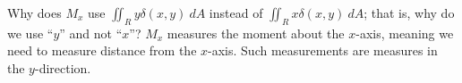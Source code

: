 {Why does $M_x$ use $\iint_R y\delta(x,y)\ dA$ instead of $\iint_R x\delta(x,y)\ dA$; that is, why do we use ``$y$'' and not ``$x$''?
}
{$M_x$ measures the moment about the $x$-axis, meaning we need to measure distance from the $x$-axis. Such measurements are measures in the $y$-direction.
}